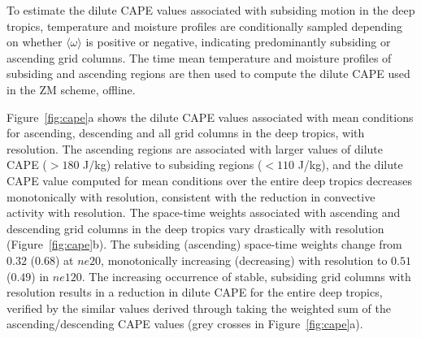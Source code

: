 \documentclass[times]{qjrms4}
\begin{document}
To estimate the dilute CAPE values associated with subsiding motion in the deep tropics, temperature and moisture profiles are conditionally sampled depending on whether $\langle \omega \rangle$ is positive or negative, indicating predominantly subsiding or ascending grid columns. The time mean temperature and moisture profiles of subsiding and ascending regions are then used to compute the dilute CAPE used in the ZM scheme, offline. 

Figure~\ref{fig:cape}a shows the dilute CAPE values associated with mean conditions for ascending, descending and all grid columns in the deep tropics, with resolution. The ascending regions are associated with larger values of dilute CAPE ($>180$ J/kg) relative to subsiding regions ($<110$ J/kg), and the dilute CAPE value computed for mean conditions over the entire deep tropics decreases monotonically with resolution, consistent with the reduction in convective activity with resolution. The space-time weights associated with ascending and descending grid columns in the deep tropics vary drastically with resolution (Figure~\ref{fig:cape}b). The subsiding (ascending) space-time weights change from $0.32$ ($0.68$) at $ne20$, monotonically increasing (decreasing) with resolution to $0.51$ ($0.49$) in $ne120$. The increasing occurrence of stable, subsiding grid columns with resolution results in a reduction in dilute CAPE for the entire deep tropics, verified by the similar values derived through taking the weighted sum of the ascending/descending CAPE values (grey crosses in Figure~\ref{fig:cape}a).
\end{document}
